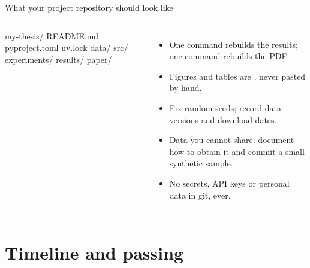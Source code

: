 \documentclass[aspectratio=169,11pt,t]{beamer}
\begin{document}
\begin{frame}[fragile]{What your project repository should look like}
  \begin{columns}[T,onlytextwidth]
\begin{semiverbatim}\footnotesize
my-thesis/
  README.md       
  pyproject.toml  
  uv.lock
  data/           
  src/            
  experiments/    
  results/        
  paper/          
\end{semiverbatim}
    \begin{itemize}
      \item One command rebuilds the results; one command rebuilds the PDF.
      \item Figures and tables are , never pasted by hand.
      \item Fix random seeds; record data versions and download dates.
      \item Data you cannot share: document how to obtain it and commit a small synthetic sample.
      \item No secrets, API keys or personal data in git, ever.
    \end{itemize}
  \end{columns}
\end{frame}

\section{Timeline and passing}
\end{document}
